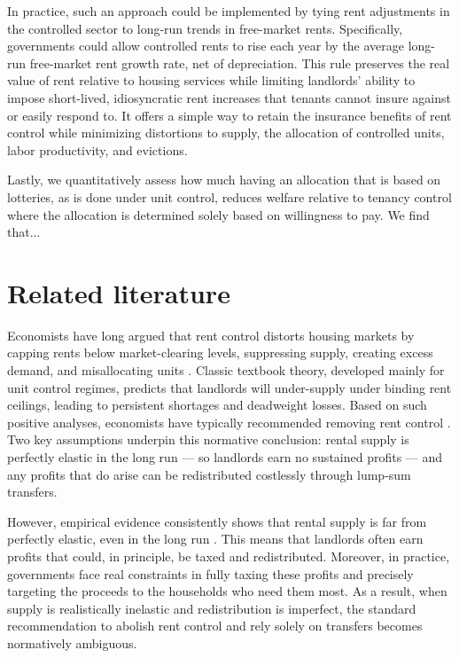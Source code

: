 \documentclass[parskip=full]{article}
\begin{document}
In practice, such an approach could be implemented by tying rent adjustments in the controlled sector to long-run trends in free-market rents. Specifically, governments could allow controlled rents to rise each year by the average long-run free-market rent growth rate, net of depreciation. This rule preserves the real value of rent relative to housing services while limiting landlords' ability to impose short-lived, idiosyncratic rent increases that tenants cannot insure against or easily respond to. It offers a simple way to retain the insurance benefits of rent control while minimizing distortions to supply, the allocation of controlled units, labor productivity, and evictions.

Lastly, we quantitatively assess how much having an allocation that is based on lotteries, as is done under unit control, reduces welfare relative to tenancy control where the allocation is determined solely based on willingness to pay. We find that...

\section{Related literature}\label{sec:related_lit}

Economists have long argued that rent control distorts housing markets by capping rents below market-clearing levels, suppressing supply, creating excess demand, and misallocating units \citep{suen-1989, gl-2003, diamond-2019}. Classic textbook theory, developed mainly for unit control regimes, predicts that landlords will under-supply under binding rent ceilings, leading to persistent shortages and deadweight losses. Based on such positive analyses, economists have typically recommended removing rent control \citep{lindbeck1971, buchanan_1986, friedman_stigler_1946}. Two key assumptions underpin this normative conclusion: rental supply is perfectly elastic in the long run — so landlords earn no sustained profits — and any profits that do arise can be redistributed costlessly through lump-sum transfers.

However, empirical evidence consistently shows that rental supply is far from perfectly elastic, even in the long run \citep{cy-1994, susin-2002, fack-2006, sy-2020, rs-2023}. This means that landlords often earn profits that could, in principle, be taxed and redistributed. Moreover, in practice, governments face real constraints in fully taxing these profits and precisely targeting the proceeds to the households who need them most. As a result, when supply is realistically inelastic and redistribution is imperfect, the standard recommendation to abolish rent control and rely solely on transfers becomes normatively ambiguous.
\end{document}
